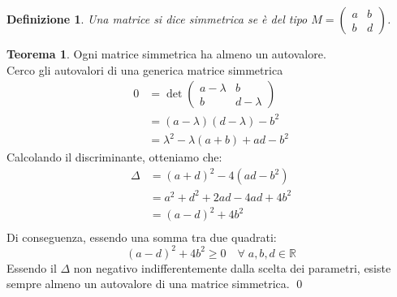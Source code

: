 \documentclass[10pt,a4paper]{article}
\theoremstyle{plain}
\newtheorem{definizione}[subsection]{Definizione}
\theoremstyle{definition}
\newtheorem{teorema}[subsection]{Teorema}
\begin{document}
\begin{definizione}
	Una matrice si dice simmetrica se è del tipo $M=\begin{pmatrix}
		a & b \\ b & d
	\end{pmatrix}$.
\end{definizione}
\begin{teorema} \label{delta}
	Ogni matrice simmetrica ha almeno un autovalore. \\
\proof
\[\]
Cerco gli autovalori di una generica matrice simmetrica
	\begin{align*}
		0&=\det{\begin{pmatrix}
			a-\lambda & b \\ b & d-\lambda
			\end{pmatrix}}
		\\
		&=(a-\lambda)(d-\lambda)-b^2\\
		&=\lambda^2 -\lambda(a+b) +ad -b^2
	\end{align*}
	Calcolando il discriminante, otteniamo che:
	\begin{align*}
		\Delta&=(a+d)^2-4(ad-b^2) \\
		&=a^2+d^2+2ad-4ad+4b^2\\
		&=(a-d)^2 + 4b^2\\
	\end{align*}
	Di conseguenza, essendo una somma tra due quadrati:
	\[
		(a-d)^2 + 4b^2 \ge 0 \quad \forall \; a,b,d\in\mathbb{R}
	\]
	Essendo il $\Delta$ non negativo indifferentemente dalla scelta dei parametri, esiste sempre almeno un autovalore di una matrice simmetrica.
	\qed
\end{teorema}
\newpage
\end{document}

